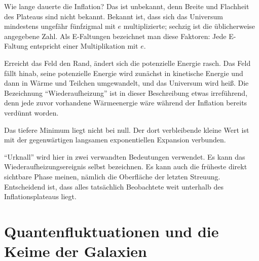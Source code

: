 Wie lange dauerte die Inflation? Das ist unbekannt, denn Breite und Flachheit des Plateaus sind nicht bekannt. Bekannt ist, dass sich das Universum mindestens ungefähr fünfzigmal mit \(e\) multiplizierte; sechzig ist die üblicherweise angegebene Zahl. Als E-Faltungen bezeichnet man diese Faktoren: Jede E-Faltung entspricht einer Multiplikation mit \(e\).

Erreicht das Feld den Rand, ändert sich die potenzielle Energie rasch. Das Feld fällt hinab, seine potenzielle Energie wird zunächst in kinetische Energie und dann in Wärme und Teilchen umgewandelt, und das Universum wird heiß. Die Bezeichnung ``Wiederaufheizung'' ist in dieser Beschreibung etwas irreführend, denn jede zuvor vorhandene Wärmeenergie wäre während der Inflation bereits verdünnt worden.

Das tiefere Minimum liegt nicht bei null. Der dort verbleibende kleine Wert ist mit der gegenwärtigen langsamen exponentiellen Expansion verbunden.

\begin{classroomqa}
\end{classroomqa}

``Urknall'' wird hier in zwei verwandten Bedeutungen verwendet. Es kann das Wiederaufheizungsereignis selbst bezeichnen. Es kann auch die früheste direkt sichtbare Phase meinen, nämlich die Oberfläche der letzten Streuung. Entscheidend ist, dass alles tatsächlich Beobachtete weit unterhalb des Inflationsplateaus liegt.

\begin{classroomqa}
\end{classroomqa}

\section{Quantenfluktuationen und die Keime der Galaxien}

